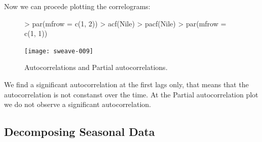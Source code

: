 \documentclass[11pt, a4paper]{article} %
\begin{document}
Now we can procede plotting the correlograms:
\begin{figure}
\centering
\begin{Schunk}
\begin{Sinput}
> par(mfrow = c(1, 2))
> acf(Nile)
> pacf(Nile)
> par(mfrow = c(1, 1))
\end{Sinput}
\end{Schunk}
\texttt{[image: sweave-009]}
\caption{Autocorrelations and Partial autocorrelations.}
\end{figure}

We find a significant autocorrelation at the first lags only, that means that the autocorrelation is not constanst over the time.
At the Partial autocorrelation plot we do not observe a significant autocorrelation. 


\subsection{Decomposing Seasonal Data}%
\end{document}
